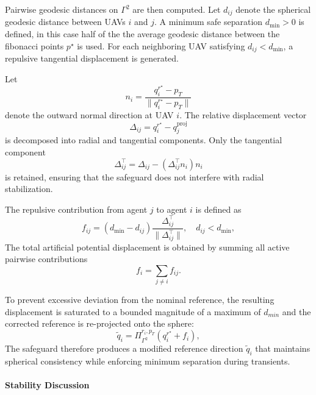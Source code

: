 Pairwise geodesic distances on $\Gamma^2$ are then computed.
Let $d_{ij}$ denote the spherical geodesic distance between UAVs $i$
and $j$. A minimum safe separation $d_{\min} > 0$ is defined, in this case half of the the average geodesic distance between the fibonacci points $p^\star$ is used.
For each neighboring UAV satisfying $d_{ij} < d_{\min}$, a repulsive
tangential displacement is generated.

Let
\begin{equation}
    n_i = \frac{q_{i}^{r^\star} - p_T}{\|q_{i}^{r^\star} - p_T\|}
\end{equation}
denote the outward normal direction at UAV $i$.
The relative displacement vector
\begin{equation}
    \Delta_{ij} = q_{i}^{r^\star} - q_{j}^{\mathrm{proj}}
\end{equation}
is decomposed into radial and tangential components.
Only the tangential component
\begin{equation}
    \Delta_{ij}^{\top}
    =
    \Delta_{ij}
    -
    (\Delta_{ij}^{\top} n_i) n_i
\end{equation}
is retained, ensuring that the safeguard does not interfere with
radial stabilization.

The repulsive contribution from agent $j$ to agent $i$ is defined as
\begin{equation}
    f_{ij}
    =
    (d_{\min} - d_{ij})
    \frac{\Delta_{ij}^{\top}}{\|\Delta_{ij}^{\top}\|},
    \quad d_{ij} < d_{\min},
\end{equation}
The total artificial potential displacement is obtained by summing all
active pairwise contributions
\begin{equation}
    f_i = \sum_{j \neq i} f_{ij}.
\end{equation}

To prevent excessive deviation from the nominal reference, the
resulting displacement is saturated to a bounded magnitude of a maximum of $d_{min}$ and the
corrected reference is re-projected onto the sphere:
\begin{equation}
    \tilde{q}_i =
    \Pi_{\Gamma^2}^{r_i,p_T}
    \left(
        q_{i}^{r^\star} + f_i
    \right),
    \label{eq:apf_result}
\end{equation}
The safeguard therefore produces a modified reference direction
$\tilde{q}_i$ that maintains spherical consistency while enforcing
minimum separation during transients.

\paragraph*{Stability Discussion}

